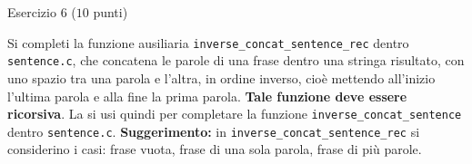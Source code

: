 \documentclass[12pt]{article}
\begin{document}
\vspace*{1ex}
\begin{center}{\Large Esercizio 6} ($10$ punti)\end{center}
Si completi la funzione ausiliaria \texttt{inverse\_concat\_sentence\_rec} dentro \texttt{sentence.c},
che concatena le parole di una frase dentro una stringa risultato, con uno spazio tra una
parola e l'altra, in ordine inverso, cio\`e mettendo all'inizio l'ultima parola e alla fine la prima parola.
\textbf{Tale funzione deve essere ricorsiva}. La si usi quindi per
completare la funzione \texttt{inverse\_concat\_sentence} dentro \texttt{sentence.c}.
\textbf{Suggerimento:} in \texttt{inverse\_concat\_sentence\_rec}
si considerino i casi: frase vuota, frase di una sola parola, frase di pi\`u parole.
\end{document}
